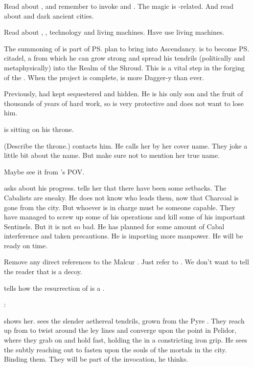 
\bookchapter{\LocarPsyrex}
Read about , and remember to invoke \Sethicus and \Tiamat. 
The magic is \xs-related. 
And read about \Nithdornazsh and dark ancient cities.

Read about \Psyrex, \dragons, technology and living machines. 
Have \Psyrex use living machines. 

The summoning of \Nithdornazsh{} is part of \ps{\Secherdamon} plan to bring  into Ascendancy. 
\Nithdornazsh{} is to become \ps{\Vizsherioch} citadel, a \nexus{} from which he can grow strong and spread his tendrils (politically and metaphysically) into the Realm of the Shroud. 
This is a vital step in the forging of the . 
When the \Nithdornazsh{} project is complete, \Vizsherioch{} is more Dagger-y than ever. 

Previously, \Secherdamon{} had kept \Vizsherioch{} sequestered and hidden. 
He is his only son and the fruit of thousands of years of hard work, so \Secherdamon{} is very protective and does not want to lose him. 

\Psyrex is sitting on his throne. 


(Describe the throne.)  
\Takestsha contacts him.
He calls her by her cover name.
They joke a little bit about the name.
But make sure not to mention her true name. 

Maybe see it from \Takestsha's POV. 

\Takestsha asks \Psyrex about his progress. 
\Psyrex tells her that there have been some setbacks. 
The Cabalists are sneaky.
He does not know who leads them, now that Charcoal is gone from the city. 
But whoever is in charge must be someone capable. 
They have managed to screw up some of his operations and kill some of his important Sentinels. 
But it is not so bad. 
He has planned for some amount of Cabal interference and taken precautions. 
He is importing more manpower. 
He will be ready on time. 

Remove any direct references to the Malcur \nexus. 
Just refer to . 
We don't want to tell the reader that \Forclin{} is a decoy. 

\Psyrex{} tells how the resurrection of \Nithdornazsh{} is a .  

\Vizsherioch: 

\Psyrex shows her. 
\Takestsha sees the slender aethereal tendrils, grown from the Pyre \matrix.
They reach up from \Nithdornazsh to twist around the ley lines and converge upon the \nexus point in Pelidor, where they grab on and hold fast, holding the \nexus in a constricting iron grip. 
He sees the \matrix subtly reaching out to fasten upon the souls of the mortals in the city. 
Binding them.
They will be part of the invocation, he thinks. 

